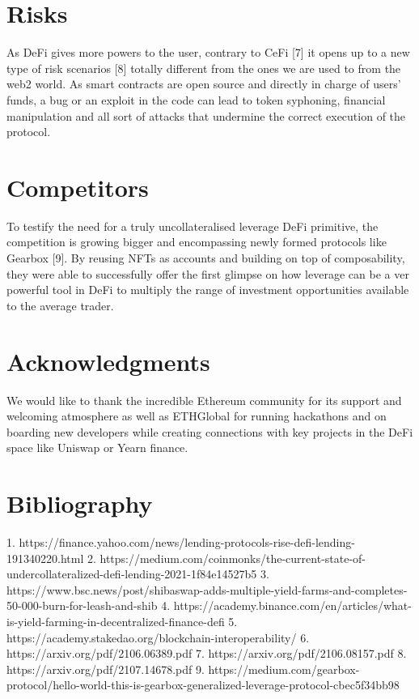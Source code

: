 \documentclass[a4paper,10 pt]{article}
\theoremstyle{definition}
\begin{document}
\section{Risks}
As DeFi gives more powers to the user, contrary to CeFi [7] it  opens up to a new type of risk scenarios [8] totally different from the ones we are used to from the web2 world. As smart contracts are open source and directly in charge of users' funds, a bug or an exploit in the code can lead to token syphoning, financial manipulation and all sort of attacks that undermine the correct execution of the protocol. 

\section{Competitors}
To testify the need for a truly uncollateralised leverage DeFi primitive, the competition is growing bigger and encompassing newly formed protocols like Gearbox [9]. By reusing NFTs as accounts and building on top of composability, they were able to successfully offer the first glimpse on how leverage can be a ver powerful tool in DeFi to multiply the range of investment opportunities available to the average trader.

\section{Acknowledgments}

We would like to thank the incredible Ethereum community for its support and welcoming atmosphere as well as ETHGlobal for running hackathons and on boarding new developers while creating connections with key projects in the DeFi space like Uniswap or Yearn finance.

\section{Bibliography}
1. https://finance.yahoo.com/news/lending-protocols-rise-defi-lending-191340220.html
2. https://medium.com/coinmonks/the-current-state-of-undercollateralized-defi-lending-2021-1f84e14527b5
3. https://www.bsc.news/post/shibaswap-adds-multiple-yield-farms-and-completes-50-000-burn-for-leash-and-shib
4. https://academy.binance.com/en/articles/what-is-yield-farming-in-decentralized-finance-defi
5. https://academy.stakedao.org/blockchain-interoperability/
6. https://arxiv.org/pdf/2106.06389.pdf
7. https://arxiv.org/pdf/2106.08157.pdf
8. https://arxiv.org/pdf/2107.14678.pdf
9. https://medium.com/gearbox-protocol/hello-world-this-is-gearbox-generalized-leverage-protocol-cbec5f34bb98
\end{document}
